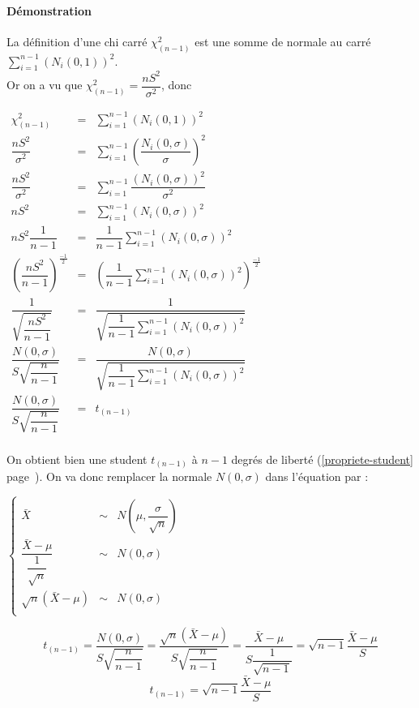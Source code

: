 \paragraph{Démonstration} La définition d'une chi carré $\chi^2_{(n-1)}$ est une somme de normale au carré $\displaystyle\sum_{i=1}^{n-1} (N_i(0,1))^2$.\\Or on a vu que $\chi^2_{(n-1)} = \dfrac{nS^2}{\sigma^2}$, donc
\begin{center}
	$\begin{array}{LCL}
		\chi^2_{(n-1)} &=& \sum_{i=1}^{n-1} (N_i(0,1))^2\\
		\dfrac{nS^2}{\sigma^2} &=& \sum_{i=1}^{n-1} \left(\dfrac{N_i(0,\sigma)}{\sigma}\right)^2\\
		\dfrac{nS^2}{\sigma^2} &=& \sum_{i=1}^{n-1} \dfrac{(N_i(0,\sigma))^2}{\sigma^2}\\
		nS^2 &=& \sum_{i=1}^{n-1} (N_i(0,\sigma))^2\\
		nS^2 \dfrac{1}{n-1}&=& \dfrac{1}{n-1} \sum_{i=1}^{n-1} (N_i(0,\sigma))^2\\
		\left(\dfrac{nS^2}{n-1}\right)^{\frac{-1}{2}} &=& \left(\dfrac{1}{n-1} \sum_{i=1}^{n-1} (N_i(0,\sigma))^2 \right)^{\frac{-1}{2}}\\
		\dfrac{1}{\sqrt{\dfrac{nS^2}{n-1}}} &=& \dfrac{1}{\sqrt{\dfrac{1}{n-1} \displaystyle\sum_{i=1}^{n-1} (N_i(0,\sigma))^2}}\\
		\dfrac{N(0,\sigma)}{S\sqrt{\dfrac{n}{n-1}}} &=& \dfrac{N(0,\sigma)}{\sqrt{\dfrac{1}{n-1} \displaystyle\sum_{i=1}^{n-1} (N_i(0,\sigma))^2}}\\
		\dfrac{N(0,\sigma)}{S\sqrt{\dfrac{n}{n-1}}} &=& t_{(n-1)}\\
	\end{array}$
\end{center}
On obtient bien une student $t_{(n-1)}$ à $n-1$ degrés de liberté (\ref{propriete-student} page~\pageref{propriete-student}). On va donc remplacer la normale $N(0,\sigma)$ dans l'équation par :
\begin{center}
	$\left\{\begin{array}{LCLL}
		\bar{X} &\sim& N\left(\mu,\dfrac{\sigma}{\sqrt{n}}\right)\\
		\dfrac{\bar{X}-\mu}{\dfrac{1}{\sqrt{n}}} &\sim& N(0,\sigma)\\
		\sqrt{n}\left(\bar{X}-\mu\right) &\sim& N(0,\sigma)\\
	\end{array}\right.$
\end{center}
$$t_{(n-1)} = \dfrac{N(0,\sigma)}{S\sqrt{\dfrac{n}{n-1}}} = \dfrac{\sqrt{n}\left(\bar{X}-\mu\right)}{S\sqrt{\dfrac{n}{n-1}}} = \dfrac{\bar{X}-\mu}{S\dfrac{1}{\sqrt{n-1}}} = \sqrt{n-1}\dfrac{\bar{X}-\mu}{S}$$
$$\boxed{t_{(n-1)} = \sqrt{n-1}\dfrac{\bar{X}-\mu}{S}}$$